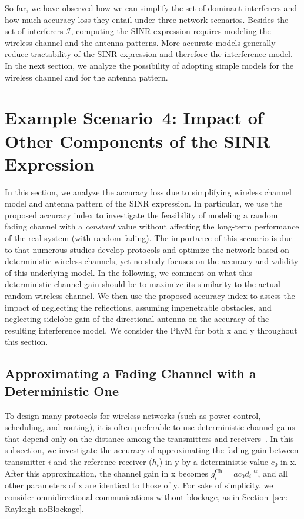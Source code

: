 \documentclass[12pt, draftclsnofoot, onecolumn]{IEEEtran}
\begin{document}
So far, we have observed how we can simplify the set of dominant interferers and how much accuracy loss they entail under three network scenarios. Besides the set of interferers $\mathcal{I}$, computing the SINR expression requires modeling the wireless channel and the antenna patterns. More accurate models generally reduce tractability of the SINR expression and therefore the interference model. In the next section, we analyze the possibility of adopting simple models for the wireless channel and for the antenna pattern.

\section{Example Scenario~4: Impact of Other Components of the SINR Expression}\label{sec: FurtherDiscussions}
In this section, we analyze the accuracy loss due to simplifying wireless channel model and antenna pattern of the SINR expression. In particular, we use the proposed accuracy index to investigate the feasibility of modeling a random fading channel with a \emph{constant} value without affecting the long-term performance of the real system (with random fading). The importance of this scenario is due to that numerous studies develop protocols and optimize the network based on deterministic wireless channels, yet no study focuses on the accuracy and validity of this underlying model. In the following, we comment on what this deterministic channel gain should be to maximize its similarity to the actual random wireless channel.
We then use the proposed accuracy index to assess the impact of neglecting the reflections, assuming impenetrable obstacles, and neglecting sidelobe gain of the directional antenna on the accuracy of the resulting interference model. We consider the PhyM for both $\mathrm{x}$ and $\mathrm{y}$ throughout this section.

\subsection{Approximating a Fading Channel with a Deterministic One}\label{sec: FadingChannelDeterministic}
To design many protocols for wireless networks (such as power control, scheduling, and routing), it is often preferable to use deterministic channel gains that depend only on the distance among the transmitters and receivers~\cite{badia2008general,chen2006cross,Singh2011Interference,Singh2009Blockage,Stahlbuhk2016Topology}. In this subsection, we investigate the accuracy of approximating the fading gain between transmitter $i$ and the reference receiver ($h_i$) in $\mathrm{y}$ by a deterministic value $c_0$ in $\mathrm{x}$. After this approximation, the channel gain in $\mathrm{x}$ becomes
$g_i^{\mathrm{Ch}} = a c_0 d_{i}^{-\alpha}$, and all other parameters of $\mathrm{x}$ are identical to those of $\mathrm{y}$. For sake of simplicity, we consider omnidirectional communications without blockage, as in Section~\ref{sec: Rayleigh-noBlockage}.
\end{document}
